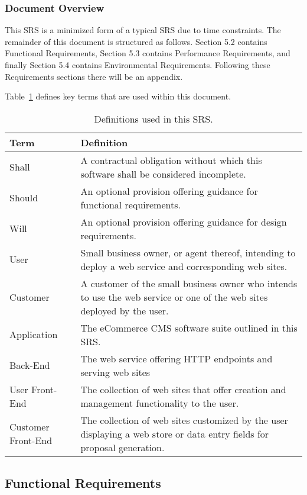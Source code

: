 \documentclass{article}
\begin{document}
\subsubsection{Document Overview}

This SRS is a minimized form of a typical SRS due to time constraints.  The
remainder of this document is structured as follows.  Section 5.2 contains
Functional Requirements, Section 5.3 contains Performance Requirements, and
finally Section 5.4 contains Environmental Requirements.  Following these
Requirements sections there will be an appendix.

Table~\ref{terms} defines key terms that are used within this document.

\begin{table}
    \begin{tabular}{|l|p{11cm}|}\hline
        Term & Definition \\\hline\hline
        Shall & A contractual obligation without which this software shall be considered incomplete. \\\hline
        Should & An optional provision offering guidance for functional requirements. \\\hline
        Will & An optional provision offering guidance for design requirements. \\\hline
        User & Small business owner, or agent thereof, intending to deploy a web service
        and corresponding web sites. \\\hline
        Customer & A customer of the small business owner who intends to use the web service
        or one of the web sites deployed by the user. \\\hline
        Application & The eCommerce CMS software suite outlined in this SRS. \\\hline
        Back-End & The web service offering HTTP endpoints and serving web sites \\\hline
        User Front-End & The collection of web sites that offer creation and management
        functionality to the user. \\\hline
        Customer Front-End & The collection of web sites customized by the user displaying
        a web store or data entry fields for proposal generation.\\\hline
    \end{tabular}
    \caption{Definitions used in this SRS.}
    \label{terms}
\end{table}

\pagebreak
\subsection{Functional Requirements}
\end{document}
